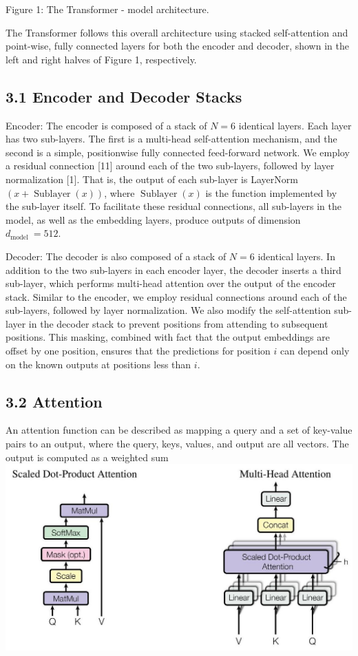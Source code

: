 \documentclass[10pt]{article}
\begin{document}
Figure 1: The Transformer - model architecture.

The Transformer follows this overall architecture using stacked self-attention and point-wise, fully connected layers for both the encoder and decoder, shown in the left and right halves of Figure 1, respectively.

\subsection*{3.1 Encoder and Decoder Stacks}
Encoder: The encoder is composed of a stack of $N=6$ identical layers. Each layer has two sub-layers. The first is a multi-head self-attention mechanism, and the second is a simple, positionwise fully connected feed-forward network. We employ a residual connection [11] around each of the two sub-layers, followed by layer normalization [1]. That is, the output of each sub-layer is LayerNorm $(x+\operatorname{Sublayer}(x))$, where $\operatorname{Sublayer}(x)$ is the function implemented by the sub-layer itself. To facilitate these residual connections, all sub-layers in the model, as well as the embedding layers, produce outputs of dimension $d_{\text {model }}=512$.

Decoder: The decoder is also composed of a stack of $N=6$ identical layers. In addition to the two sub-layers in each encoder layer, the decoder inserts a third sub-layer, which performs multi-head attention over the output of the encoder stack. Similar to the encoder, we employ residual connections around each of the sub-layers, followed by layer normalization. We also modify the self-attention sub-layer in the decoder stack to prevent positions from attending to subsequent positions. This masking, combined with fact that the output embeddings are offset by one position, ensures that the predictions for position $i$ can depend only on the known outputs at positions less than $i$.

\subsection*{3.2 Attention}
An attention function can be described as mapping a query and a set of key-value pairs to an output, where the query, keys, values, and output are all vectors. The output is computed as a weighted sum\\
\includegraphics[max width=\textwidth, center]{2024_11_26_7ad1d7977194ba7a884dg-04}
\end{document}
